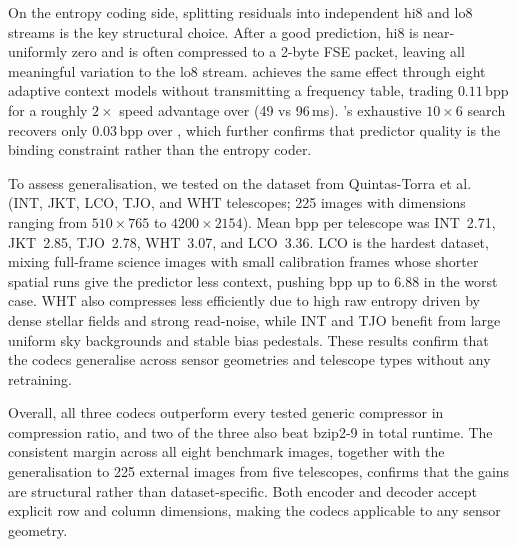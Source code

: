 On the entropy coding side, splitting residuals into independent hi8 and lo8
streams is the key structural choice. After a good prediction, hi8 is
near-uniformly zero and is often compressed to a 2-byte FSE packet, leaving
all meaningful variation to the lo8 stream. \spdfocused{} achieves the same
effect through eight adaptive context models without transmitting a frequency
table, trading $0.11$\,bpp for a roughly $2\times$ speed advantage over
\allrounder{} (49 vs 96\,ms). \cmpfocused{}'s exhaustive $10\times6$ search
recovers only $0.03$\,bpp over \allrounder{}, which further confirms that
predictor quality is the binding constraint rather than the entropy coder.

To assess generalisation, we tested \allrounder{} on the dataset from
Quintas-Torra et al.~\cite{quintas2026} (INT, JKT, LCO, TJO, and WHT
telescopes; 225 images with dimensions ranging from $510\times765$ to
$4200\times2154$). Mean bpp per telescope was INT~2.71, JKT~2.85, TJO~2.78,
WHT~3.07, and LCO~3.36. LCO is the hardest dataset, mixing full-frame science
images with small calibration frames whose shorter spatial runs give the
predictor less context, pushing bpp up to 6.88 in the worst case. WHT also
compresses less efficiently due to high raw entropy driven by dense stellar
fields and strong read-noise, while INT and TJO benefit from large uniform sky
backgrounds and stable bias pedestals. These results confirm that the codecs
generalise across sensor geometries and telescope types without any retraining.

Overall, all three codecs outperform every tested generic compressor in
compression ratio, and two of the three also beat bzip2-9 in total runtime.
The consistent margin across all eight benchmark images, together with the
generalisation to 225 external images from five telescopes, confirms that the
gains are structural rather than dataset-specific. Both encoder and decoder
accept explicit row and column dimensions, making the codecs applicable to any
sensor geometry.
